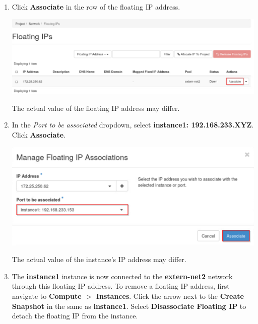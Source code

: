 \documentclass[letterpaper, 12pt]{article}
\begin{document}
\begin{enumerate}
    \item Click \textbf{Associate} in the row of the floating IP address.

    \begin{center}
        \includegraphics[width=\linewidth]{images/part3/step6.png}
    \end{center}
    
    \begin{notebox}
        The actual value of the floating IP address may differ.
    \end{notebox}

    \item In the \textit{Port to be associated} dropdown, select \textbf{instance1: 192.168.233.XYZ}. Click
    \textbf{Associate}.

    \begin{center}
        \includegraphics[width=\linewidth]{images/part3/step7.png}
    \end{center}

    \begin{notebox}
        The actual value of the instance's IP address may differ.
    \end{notebox}

    \item The \textbf{instance1} instance is now connected to the \textbf{extern-net2} network through this floating IP
    address. To remove a floating IP address, first navigate to \textbf{Compute $>$ Instances}. Click the arrow next to
    the \textbf{Create Snapshot} in the same as \textbf{instance1}. Select \textbf{Disassociate Floating IP} to detach
    the floating IP from the instance.


\end{enumerate}
\end{document}
